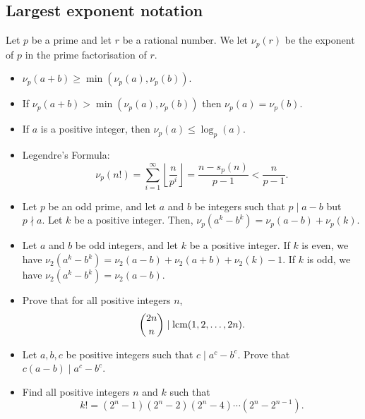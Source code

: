\subsection{Largest exponent notation}
  Let $p$ be a prime and let $r$ be a rational number. We let $\nu_p(r)$ be the
  exponent of $p$ in the prime factorisation of $r$.
\begin{itemize}
  \item $\nu_p(a+b)\ge\min(\nu_p(a),\nu_p(b))$.
  \item If $\nu_p(a+b)>\min(\nu_p(a),\nu_p(b))$ then $\nu_p(a)=\nu_p(b)$.
  \item If $a$ is a positive integer, then $\nu_p(a)\le\log_p(a)$.
\end{itemize}
\begin{itemize}
  \item Legendre's Formula:
    \[\nu_p(n!)=\sum_{i=1}^\infty\left\lfloor\frac
      n{p^i}\right\rfloor=\frac{n-s_p(n)}{p-1}<\frac
    n{p-1}.\]
\item Let $p$ be an odd prime, and let $a$ and $b$ be integers such that $p\mid
    a-b$ but $p\nmid a$. Let $k$ be a positive integer.
    Then, $\nu_p\left(a^k-b^k\right)=\nu_p(a-b)+\nu_p(k)$.

\item Let $a$ and $b$ be odd integers, and let $k$ be a positive integer.
    If $k$ is even, we have $\nu_2(a^k-b^k)=\nu_2(a-b)+\nu_2(a+b)+\nu_2(k)-1$.
    If $k$ is odd, we have $\nu_2(a^k-b^k)=\nu_2(a-b)$.
\end{itemize}
\begin{itemize}
  \item Prove that for all positive integers $n$,
    \[\binom{2n}n\mid\mathrm{lcm}(1,2,\ldots,2n).\]
  \item Let $a,b,c$ be positive integers such that $c\mid a^c-b^c$. Prove that
    $c(a-b)\mid a^c-b^c$.
  \item Find all positive integers $n$ and $k$ such that
      \[k!=(2^n-1)(2^n-2)(2^n-4)\cdots(2^n-2^{n-1}).\]
\end{itemize}
